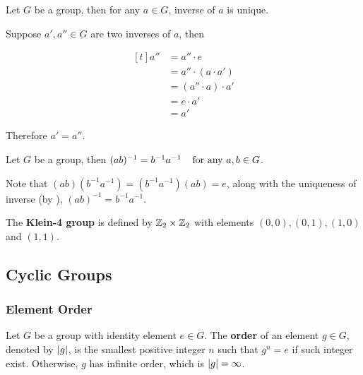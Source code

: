 \documentclass[a4paper,12pt]{article}
\begin{document}
\begin{pst}
  Let $G$ be a group, then for any $a\in G$, inverse of $a$ is unique.\n

  \prf Suppose $a',a''\in G$ are two inverses of $a$, then

  $$\begin{aligned}[t]
    a''&=a''\cdot e\\
    &=a''\cdot(a\cdot a')\\
    &=(a''\cdot a)\cdot a'\\
    &=e\cdot a'\\
    &=a'
  \end{aligned}$$

  Therefore $a'=a''$.
\end{pst}\n

\begin{pst}
  Let $G$ be a group, then $(ab)^{-1}=b^{-1}a^{-1}\;\;\;\;\text{for any }a,b\in G$.\n

  \prf Note that $(ab)(b^{-1}a^{-1})=(b^{-1}a^{-1})(ab)=e$, along with the uniqueness of inverse (by \rpst[\sctr{2}]), $(ab)^{-1}=b^{-1}a^{-1}$.
\end{pst}\n

\n

\begin{dft}
  The \textbf{Klein-4 group} is defined by $\mathbb{Z}_{2}\times\mathbb{Z}_{2}$ with elements $(0,0),(0,1),(1,0)$ and $(1,1)$.
\end{dft}

\subsection{Cyclic Groups}
\subsubsection{Element Order}
\begin{dft}
  Let $G$ be a group with identity element $e\in G$. The \textbf{order} of an element $g\in G$, denoted by $\left| g\right|$, is the smallest positive integer $n$ such that $g^{n}=e$ if such integer exist. Otherwise, $g$ has infinite order, which is $\left| g\right|=\infty$.
\end{dft}\n
\end{document}
